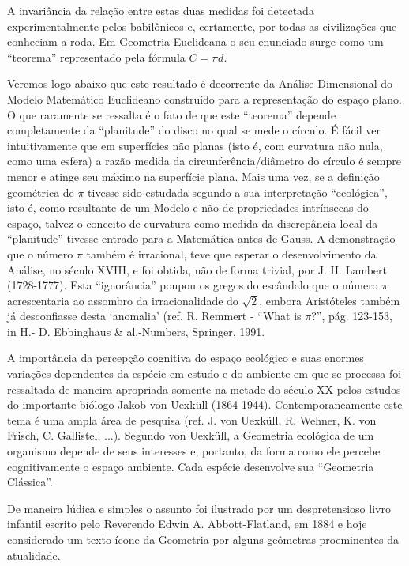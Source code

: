     A invariância da relação entre estas duas medidas foi detectada experimentalmente pelos babilônicos e, certamente, por todas as civilizações que conheciam a roda. Em Geometria Euclideana o seu enunciado surge como um ``teorema'' representado pela fórmula \(C = \pi d\).

    Veremos logo abaixo que este resultado é decorrente da Análise Dimensional do Modelo Matemático Euclideano construído para a representação do espaço plano. O que raramente se ressalta é o fato de que este ``teorema'' depende completamente da ``planitude'' do disco no qual se mede o círculo. É fácil ver intuitivamente que em superfícies não planas (isto é, com curvatura não nula, como uma esfera) a razão medida da circunferência/diâmetro do círculo é sempre menor e atinge seu máximo na superfície plana. Mais uma vez, se a definição geométrica de \(\pi\) tivesse sido estudada segundo a sua interpretação ``ecológica'', isto é, como resultante de um Modelo e não de propriedades intrínsecas do espaço, talvez o conceito de curvatura como medida da discrepância local da ``planitude'' tivesse entrado para a Matemática antes de Gauss. A demonstração que o número \(\pi\) também é irracional, teve que esperar o desenvolvimento da Análise, no século XVIII, e foi obtida, não de forma trivial, por J. H. Lambert (1728-1777). Esta ``ignorância'' poupou os gregos do escândalo que o número \(\pi\) acrescentaria ao assombro da irracionalidade do \(\sqrt{2}\), embora Aristóteles também já desconfiasse desta `anomalia’ (ref. R. Remmert - ``What is \(\pi\)?'', pág. 123-153, in H.- D. Ebbinghaus \& al.-Numbers, Springer, 1991.

    A importância da percepção cognitiva do espaço ecológico e suas enormes variações dependentes da espécie em estudo e do ambiente em que se processa foi ressaltada de maneira apropriada somente na metade do século XX pelos estudos do importante biólogo Jakob von Uexküll (1864-1944). Contemporaneamente este tema é uma ampla área de pesquisa (ref. J. von Uexküll, R. Wehner, K. von Frisch, C. Gallistel, ...). Segundo von Uexküll, a Geometria ecológica de um organismo depende de seus interesses e, portanto, da forma como ele percebe cognitivamente o espaço ambiente. Cada espécie desenvolve sua ``Geometria Clássica''.

    De maneira lúdica e simples o assunto foi ilustrado por um despretensioso livro infantil escrito pelo Reverendo Edwin A. Abbott-Flatland, em 1884 e hoje considerado um texto ícone da Geometria por alguns geômetras proeminentes da atualidade.

